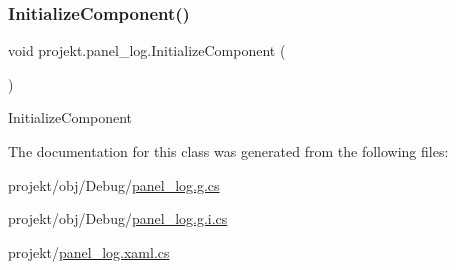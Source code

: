 \subsubsection{\texorpdfstring{Initialize\+Component()}{InitializeComponent()}\hspace{0.1cm}{\footnotesize\ttfamily [9/9]}}
{\footnotesize\ttfamily void projekt.\+panel\+\_\+log.\+Initialize\+Component (\begin{DoxyParamCaption}{ }\end{DoxyParamCaption})\hspace{0.3cm}{\ttfamily [inline]}}



Initialize\+Component 



The documentation for this class was generated from the following files\+:\begin{DoxyCompactItemize}
\item 
projekt/obj/\+Debug/\mbox{\hyperlink{_debug_2panel__log_8g_8cs}{panel\+\_\+log.\+g.\+cs}}\item 
projekt/obj/\+Debug/\mbox{\hyperlink{_debug_2panel__log_8g_8i_8cs}{panel\+\_\+log.\+g.\+i.\+cs}}\item 
projekt/\mbox{\hyperlink{panel__log_8xaml_8cs}{panel\+\_\+log.\+xaml.\+cs}}\end{DoxyCompactItemize}
